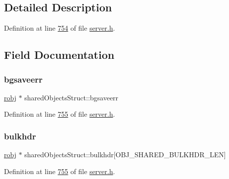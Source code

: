 \subsection{Detailed Description}


Definition at line \hyperlink{server_8h_source_l00754}{754} of file \hyperlink{server_8h_source}{server.\+h}.



\subsection{Field Documentation}
\mbox{\label{structsharedObjectsStruct_a98fe3a0213bd8f0c411416a69ba29b13}} 
\subsubsection{\texorpdfstring{bgsaveerr}{bgsaveerr}}
{\footnotesize\ttfamily \hyperlink{structredisObject}{robj} $\ast$ shared\+Objects\+Struct\+::bgsaveerr}



Definition at line \hyperlink{server_8h_source_l00755}{755} of file \hyperlink{server_8h_source}{server.\+h}.

\mbox{\label{structsharedObjectsStruct_aae85d83b1bda5d16b7715738f016b2bf}} 
\subsubsection{\texorpdfstring{bulkhdr}{bulkhdr}}
{\footnotesize\ttfamily \hyperlink{structredisObject}{robj} $\ast$ shared\+Objects\+Struct\+::bulkhdr\mbox{[}O\+B\+J\+\_\+\+S\+H\+A\+R\+E\+D\+\_\+\+B\+U\+L\+K\+H\+D\+R\+\_\+\+L\+EN\mbox{]}}



Definition at line \hyperlink{server_8h_source_l00755}{755} of file \hyperlink{server_8h_source}{server.\+h}.

\mbox{\label{structsharedObjectsStruct_a1f577bbf97ab8c6c10e0aa197bb2c5b3}} 
